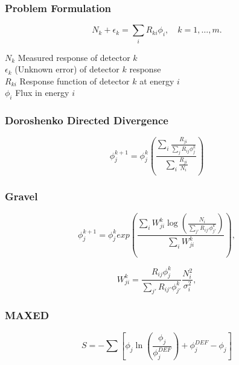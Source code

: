 \documentclass[fleqn]{beamer}
\begin{document}
\begin{frame}
\frametitle{Problem Formulation}
\begin{equation}
\label{eqn:disc-response}
N_k + \epsilon_k = \sum_i R_{ki} \phi_i, \quad k = 1,\ldots, m .
\end{equation}

$N_k$ Measured response of detector $k$\\
$\epsilon_k$ (Unknown error) of detector $k$ response\\
$R_{ki}$ Response function of detector $k$ at energy $i$\\
$\phi_i$ Flux in energy $i$\\

\end{frame}


\begin{frame}
\frametitle{Doroshenko Directed Divergence}

\begin{equation}
\label{eqn:doroshenko}
\phi_j^{k + 1} = \phi_j^{k} (\frac{\sum_i \frac{R_{ji}}{\sum_j R_{ij} \phi_j^k}}{\sum_i \frac{R_{ji}}{N_i}}) 
\end{equation}

\end{frame}

\begin{frame}
\frametitle{Gravel}

\begin{equation}
\label{eqn:sandii}
\phi_j^{k + 1} = \phi_j^{k} exp(\frac{\sum_i W_{ji}^k \log(\frac{N_i}{\sum_{j'} R_{ij'} \phi_{j'}^k})}{\sum_i W_{ji}^k}) ,
\end{equation}

\begin{equation}
\label{eqn:gravel-w}
W_{ji}^k = \frac{R_{ij} \phi_{j}^k}{\sum_{j'} R_{ij'} \phi_{j'}^k} \frac{N_i^2}{\sigma_i^2} ,
\end{equation}
\end{frame}

\begin{frame}
\frametitle{MAXED}
\begin{equation}
\label{eqn:maxed-skilling}
S = - \sum [\phi_j \ln (\frac{\phi_j}{\phi_j^{DEF}}) + \phi_j^{DEF} - \phi_j]
\end{equation}
\end{frame}
\end{document}
